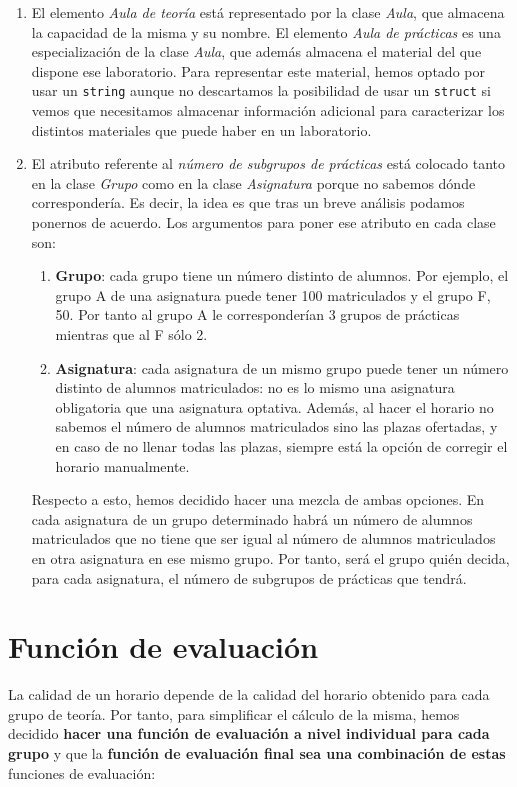 \begin{enumerate}[$\bullet$]
    \item El elemento \textit{Aula de teoría} está representado por la clase \textit{Aula}, que almacena la capacidad de la misma y su nombre. El elemento \textit{Aula de prácticas} es una especialización de la clase \textit{Aula}, que además almacena el material del que dispone ese laboratorio. Para representar este material, hemos optado por usar un \texttt{string} aunque no descartamos la posibilidad de usar un \texttt{struct} si vemos que necesitamos almacenar información adicional para caracterizar los distintos materiales que puede haber en un laboratorio.

    \item El atributo referente al \textit{número de subgrupos de prácticas} está colocado tanto en la clase \textit{Grupo} como en la clase \textit{Asignatura} porque no sabemos dónde correspondería. Es decir, la idea es que tras un breve análisis podamos ponernos de acuerdo. Los argumentos para poner ese atributo en cada clase son:
    \begin{enumerate}[---]
        \item \textbf{Grupo}: cada grupo tiene un número distinto de alumnos. Por ejemplo, el grupo A de una asignatura puede tener 100 matriculados y el grupo F, 50. Por tanto al grupo A le corresponderían 3 grupos de prácticas mientras que al F sólo 2.
        \item \textbf{Asignatura}: cada asignatura de un mismo grupo puede tener un número distinto de alumnos matriculados: no es lo mismo una asignatura obligatoria que una asignatura optativa. Además, al hacer el horario no sabemos el número de alumnos matriculados sino las plazas ofertadas, y en caso de no llenar todas las plazas, siempre está la opción de corregir el horario manualmente.
    \end{enumerate}
    Respecto a esto, hemos decidido hacer una mezcla de ambas opciones. En cada asignatura de un grupo determinado habrá un número de alumnos matriculados que no tiene que ser igual al número de alumnos matriculados en otra asignatura en ese mismo grupo. Por tanto, será el grupo quién decida, para cada asignatura, el número de subgrupos de prácticas que tendrá.
\end{enumerate} 

\section{Función de evaluación}
La calidad de un horario depende de la calidad del horario obtenido para cada grupo de teoría. Por tanto, para simplificar el cálculo de la misma, hemos decidido \textbf{hacer una función de evaluación a nivel individual para cada grupo} y que la \textbf{función de evaluación final sea una combinación de estas} funciones de evaluación:

